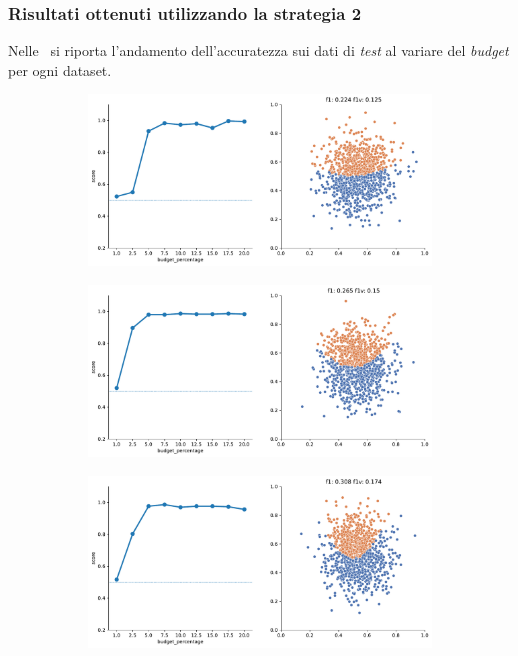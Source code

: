 \subsubsection{Risultati ottenuti utilizzando la strategia 2}
Nelle~ si riporta l'andamento dell'accuratezza sui dati di \emph{test} al variare del \emph{budget} per ogni dataset.
\begin{figure}
    \begin{subfigure}{.5\textwidth}
        \centering
        \includegraphics[width=\textwidth]{img/2d_v2/1.pdf}
    \end{subfigure}%
    \begin{subfigure}{.5\textwidth}
        \centering
        \includegraphics[width=\textwidth]{img/2d_v2/2.pdf}
    \end{subfigure}
    \hfill
    \begin{subfigure}{.5\textwidth}
        \centering
        \includegraphics[width=\textwidth]{img/2d_v2/3.pdf}

\end{subfigure}
\end{figure}
